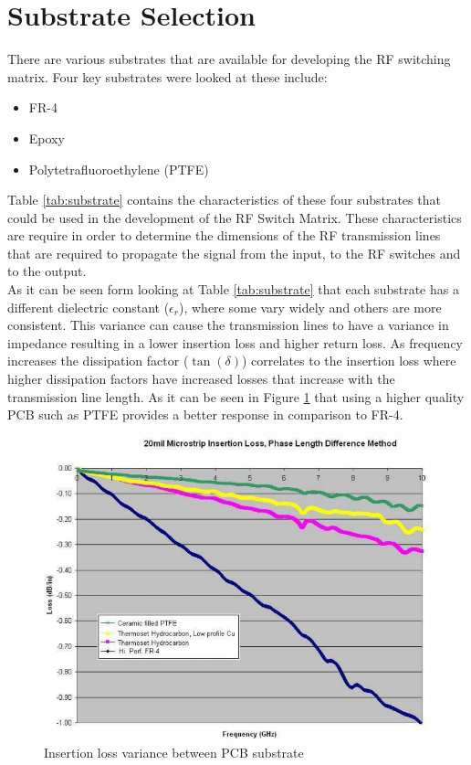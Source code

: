 \documentclass[12pt,openany,a4paper]{book}
\begin{document}
\section{Substrate Selection}
There are various substrates that are available for developing the RF switching matrix. Four key substrates were looked at these include:\\[-0.8cm]
\begin{itemize}
	\setlength\itemsep{-0.5em}
  \item FR-4
  \item Epoxy
  \item Polytetrafluoroethylene (PTFE)
\end{itemize}
Table \ref{tab:substrate} contains the characteristics of these four substrates that could be used in the development of the RF Switch Matrix. These characteristics are require in order to determine the dimensions of the RF transmission lines that are required to propagate the signal from the input, to the RF switches and to the output.\\
As it can be seen form looking at Table \ref{tab:substrate} that each substrate has a different dielectric constant ($\epsilon_r$), where some vary widely and others are more consistent. This variance can cause the transmission lines to have a variance in impedance resulting in a lower insertion loss and higher return loss. As frequency increases the dissipation factor ($\tan(\delta)$) correlates to the insertion loss where higher dissipation factors have increased losses that increase with the transmission line length. As it can be seen in Figure \ref{fig:substrate} that using a higher quality PCB such as PTFE provides a better response in comparison to FR-4.
\begin{figure}[H]
	\centering
    \includegraphics[width=1\textwidth]{pcb-substrate.png}
	\caption{Insertion loss variance between PCB substrate \cite{}}
	\label{fig:substrate}
\end{figure} 
\end{document}
